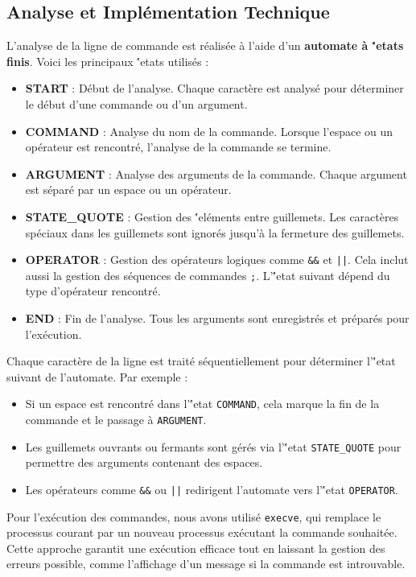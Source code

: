 \documentclass[11pt,a4paper]{article}
\begin{document}
\subsection{Analyse et Impl\'ementation Technique}

L'analyse de la ligne de commande est r\'ealis\'ee \`a l'aide d'un \textbf{automate \`a \''etats finis}. Voici les principaux \''etats utilis\'es :
\begin{itemize}
    \item \textbf{START} : D\'ebut de l'analyse. Chaque caract\`ere est analys\'e pour d\'eterminer le d\'ebut d'une commande ou d'un argument.
    \item \textbf{COMMAND} : Analyse du nom de la commande. Lorsque l'espace ou un op\'erateur est rencontr\'e, l'analyse de la commande se termine.
    \item \textbf{ARGUMENT} : Analyse des arguments de la commande. Chaque argument est s\'epar\'e par un espace ou un op\'erateur.
    \item \textbf{STATE\_QUOTE} : Gestion des \''el\'ements entre guillemets. Les caract\`eres sp\'eciaux dans les guillemets sont ignor\'es jusqu'\`a la fermeture des guillemets.
    \item \textbf{OPERATOR} : Gestion des op\'erateurs logiques comme \texttt{\&\&} et \texttt{||}. Cela inclut aussi la gestion des s\'equences de commandes \texttt{;}. L'\''etat suivant d\'epend du type d'op\'erateur rencontr\'e.
    \item \textbf{END} : Fin de l'analyse. Tous les arguments sont enregistr\'es et pr\'epar\'es pour l'ex\'ecution.
\end{itemize}

Chaque caract\`ere de la ligne est trait\'e s\'equentiellement pour d\'eterminer l'\''etat suivant de l'automate. Par exemple :
\begin{itemize}
    \item Si un espace est rencontr\'e dans l'\''etat \texttt{COMMAND}, cela marque la fin de la commande et le passage \`a \texttt{ARGUMENT}.
    \item Les guillemets ouvrants ou fermants sont g\'er\'es via l'\''etat \texttt{STATE\_QUOTE} pour permettre des arguments contenant des espaces.
    \item Les op\'erateurs comme \texttt{\&\&} ou \texttt{||} redirigent l'automate vers l'\''etat \texttt{OPERATOR}.
\end{itemize}

Pour l'ex\'ecution des commandes, nous avons utilis\'e \texttt{execve}, qui remplace le processus courant par un nouveau processus ex\'ecutant la commande souhait\'ee. Cette approche garantit une ex\'ecution efficace tout en laissant la gestion des erreurs possible, comme l'affichage d'un message si la commande est introuvable.
\end{document}
